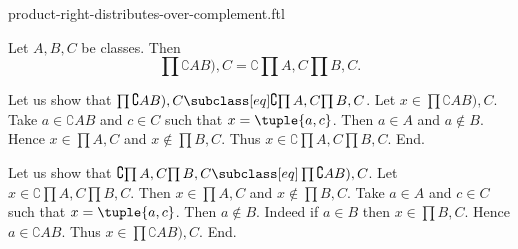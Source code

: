 \documentclass{article}
\begin{document}
\begin{smodule}[creators={Marcel Schütz}]{product-right-distributes-over-complement.ftl}

  \begin{fproposition*}[label=8685232427368448]
    Let $A, B, C$ be classes.
    Then \[\prod{\complement{A}{B}),C} = \complement{\prod{A,C}}{\prod{B,C}}.\]
  \end{fproposition*}
  \begin{fproof}
    Let us show that $\prod{\complement{A}{B}),C} \subclass[eq] \complement{\prod{A,C}}{\prod{B,C}}$.
      Let $x \in \prod{\complement{A}{B}),C}$.
      Take $a \in \complement{A}{B}$ and $c \in C$ such that $x = \tuple{a,c}$.
      Then $a \in A$ and $a \notin B$.
      Hence $x \in \prod{A,C}$ and $x \notin \prod{B,C}$.
      Thus $x \in \complement{\prod{A,C}}{\prod{B,C}}$.
    End.

    Let us show that $\complement{\prod{A,C}}{\prod{B,C}} \subclass[eq] \prod{\complement{A}{B}),C}$.
      Let $x \in \complement{\prod{A,C}}{\prod{B,C}}$.
      Then $x \in \prod{A,C}$ and $x \notin \prod{B,C}$.
      Take $a \in A$ and $c \in C$ such that $x = \tuple{a,c}$.
      Then $a \notin B$.
      Indeed if $a \in B$ then $x \in \prod{B,C}$.
      Hence $a \in \complement{A}{B}$.
      Thus $x \in \prod{\complement{A}{B}),C}$.
    End.
  \end{fproof}
\end{smodule}
\end{document}
